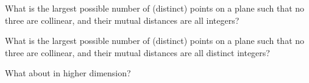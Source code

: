 What is the largest possible number of (distinct) points on a plane
such that no three are collinear,
and their mutual distances are all integers?

What is the largest possible number of (distinct) points on a plane
such that no three are collinear,
and their mutual distances are all distinct integers?

What about in higher dimension?
